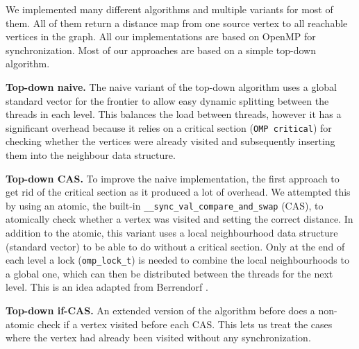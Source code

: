 \documentclass[letterpaper]{article}
\newcommand{\mypar}[1]{{\bf #1.}} %
\begin{document}
		We implemented many different algorithms and multiple variants for most of them. 			All of them return a distance map from one source vertex to all reachable vertices in the graph.
		All our implementations are based on OpenMP for synchronization.
		Most of our approaches are based on a simple top-down algorithm. 

		\mypar{Top-down naive}
		The naive variant of the top-down algorithm uses a global standard vector for the frontier to allow easy dynamic splitting between the threads in each level. 
		This balances the load between threads, however it has a significant overhead because it relies on a critical section (\verb+OMP critical+) for checking whether the vertices were already visited and subsequently inserting them into the neighbour data structure.

		\mypar{Top-down CAS}
		To improve the naive implementation, the first approach to get rid of the critical section as it produced a lot of overhead. 
		We attempted this by using an atomic, the built-in \verb+__sync_val_compare_and_swap+ (CAS), to atomically check whether a vertex was visited and setting the correct distance. 
		In addition to the atomic, this variant uses a local neighbourhood data structure (standard vector) to be able to do without a critical section. 
		Only at the end of each level a lock (\verb+omp_lock_t+) is needed to combine the local neighbourhoods to a global one, which can then be distributed between the threads for the next level. 
		This is an idea adapted from Berrendorf \cite{Berrendorf:14}.
		
		\mypar{Top-down if-CAS}
		An extended version of the algorithm before does a non-atomic check if a vertex visited before each CAS. 
		This lets us treat the cases where the vertex had already been visited without any synchronization.
\end{document}

